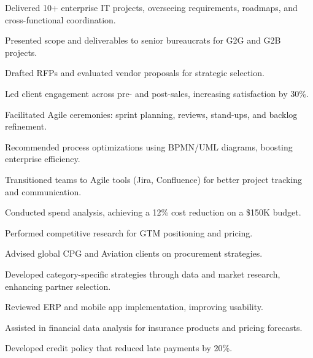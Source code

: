 \documentclass[]{deedy-resume-reversed}
\begin{document}
\begin{minipage}[t]{0.60\textwidth}
\begin{tightemize}
\item Delivered 10+ enterprise IT projects, overseeing requirements, roadmaps, and cross-functional coordination.
\item Presented scope and deliverables to senior bureaucrats for G2G and G2B projects.
\item Drafted RFPs and evaluated vendor proposals for strategic selection.
\item Led client engagement across pre- and post-sales, increasing satisfaction by 30\%.
\item Facilitated Agile ceremonies: sprint planning, reviews, stand-ups, and backlog refinement.
\item Recommended process optimizations using BPMN/UML diagrams, boosting enterprise efficiency.
\item Transitioned teams to Agile tools (Jira, Confluence) for better project tracking and communication.
\end{tightemize}
\sectionsep

\begin{tightemize}
\item Conducted spend analysis, achieving a 12\% cost reduction on a \$150K budget.
\item Performed competitive research for GTM positioning and pricing.
\item Advised global CPG and Aviation clients on procurement strategies.
\item Developed category-specific strategies through data and market research, enhancing partner selection.
\end{tightemize}
\sectionsep

\begin{tightemize}
\item Reviewed ERP and mobile app implementation, improving usability.
\item Assisted in financial data analysis for insurance products and pricing forecasts.
\item Developed credit policy that reduced late payments by 20\%.
\end{tightemize}
\sectionsep


\end{minipage}
\end{document}
